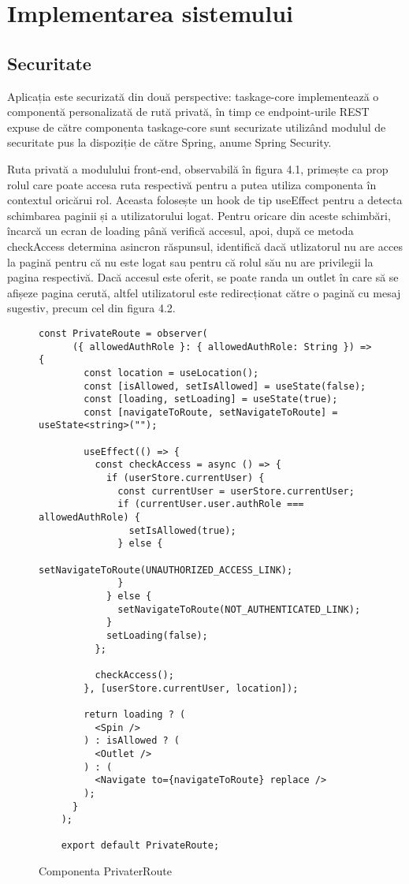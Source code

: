 \chapter{Implementarea sistemului}

\section{Securitate}

Aplicația este securizată din două perspective: taskage-core implementează o componentă personalizată de rută privată, în timp ce endpoint-urile REST expuse de către componenta taskage-core sunt securizate utilizând modulul de securitate pus la dispoziție de către Spring, anume Spring Security.

Ruta privată a modulului front-end, observabilă în figura 4.1, primește ca prop rolul care poate accesa ruta respectivă pentru a putea utiliza componenta în contextul oricărui rol. Aceasta folosește un hook de tip useEffect pentru a detecta schimbarea paginii și a utilizatorului logat. Pentru oricare din aceste schimbări, încarcă un ecran de loading până verifică accesul, apoi, după ce metoda checkAccess determina asincron răspunsul, identifică dacă utlizatorul nu are acces la pagină pentru că nu este logat sau pentru că rolul său nu are privilegii la pagina respectivă. Dacă accesul este oferit, se poate randa un outlet în care să se afișeze pagina cerută, altfel utilizatorul este redirecționat către o pagină cu mesaj sugestiv, precum cel din figura 4.2.

\begin{figure}[hbtp]
	\begin{lstlisting}[frame=single]
	const PrivateRoute = observer(
	  ({ allowedAuthRole }: { allowedAuthRole: String }) => {
	    const location = useLocation();
	    const [isAllowed, setIsAllowed] = useState(false);
	    const [loading, setLoading] = useState(true);
	    const [navigateToRoute, setNavigateToRoute] = useState<string>("");
	
	    useEffect(() => {
	      const checkAccess = async () => {
	        if (userStore.currentUser) {
	          const currentUser = userStore.currentUser;
	          if (currentUser.user.authRole === allowedAuthRole) {
	            setIsAllowed(true);
	          } else {
	            setNavigateToRoute(UNAUTHORIZED_ACCESS_LINK);
	          }
	        } else {
	          setNavigateToRoute(NOT_AUTHENTICATED_LINK);
	        }
	        setLoading(false);
	      };
	
	      checkAccess();
	    }, [userStore.currentUser, location]);
	
	    return loading ? (
	      <Spin />
	    ) : isAllowed ? (
	      <Outlet />
	    ) : (
	      <Navigate to={navigateToRoute} replace />
	    );
	  }
	);
	
	export default PrivateRoute;
	\end{lstlisting}
	\caption{Componenta PrivaterRoute}
\end{figure}

